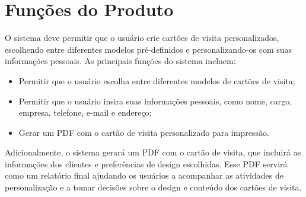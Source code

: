\section{Funções do Produto}

O sistema deve permitir que o usuário crie cartões de visita personalizados, escolhendo entre diferentes modelos pré-definidos e personalizando-os com suas informações pessoais. As principais funções do sistema incluem:

\begin{itemize}
    \item Permitir que o usuário escolha entre diferentes modelos de cartões de visita;
    \item Permitir que o usuário insira suas informações pessoais, como nome, cargo, empresa, telefone, e-mail e endereço;
    \item Gerar um PDF com o cartão de visita personalizado para impressão.
\end{itemize}

Adicionalmente, o sistema gerará um PDF com o cartão de visita, que incluirá as informações dos clientes e preferências de design escolhidas. Esse PDF servirá como um relatório final ajudando os usuários a acompanhar as atividades de personalização e a tomar decisões sobre o design e conteúdo dos cartões de visita.
